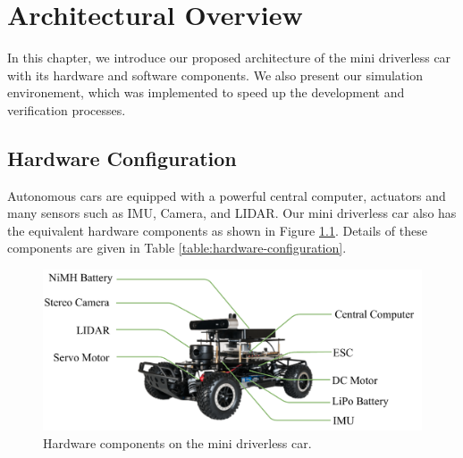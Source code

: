 \chapter{Architectural Overview}
\label{chp:b3}

In this chapter, we introduce our proposed architecture of the mini driverless
car with its hardware and software components. We also present our simulation
environement, which was implemented to speed up the development and
verification processes.

\section{Hardware Configuration}

Autonomous cars are equipped with a powerful central computer, actuators and
many sensors such as IMU, Camera, and LIDAR. Our mini driverless car also has
the equivalent hardware components as shown in Figure
\ref{figure:hardware-configuration}. Details of these components are given in
Table \ref{table:hardware-configuration}.

\begin{figure}[h]
\centering
\includegraphics[width=.8\textwidth]{figures/hardware-configuration.pdf}
\caption{Hardware components on the mini driverless car.}
\label{figure:hardware-configuration}
\end{figure}

